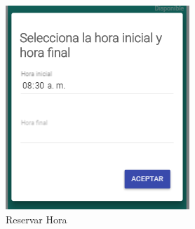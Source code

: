 	\begin{figure}[hbtp]	
		\includegraphics[scale=0.3]{images/InterfazMovil/IUGS02_reservarHoraEstableSolicitante.png}
		\caption{Reservar Hora}
	\end{figure}